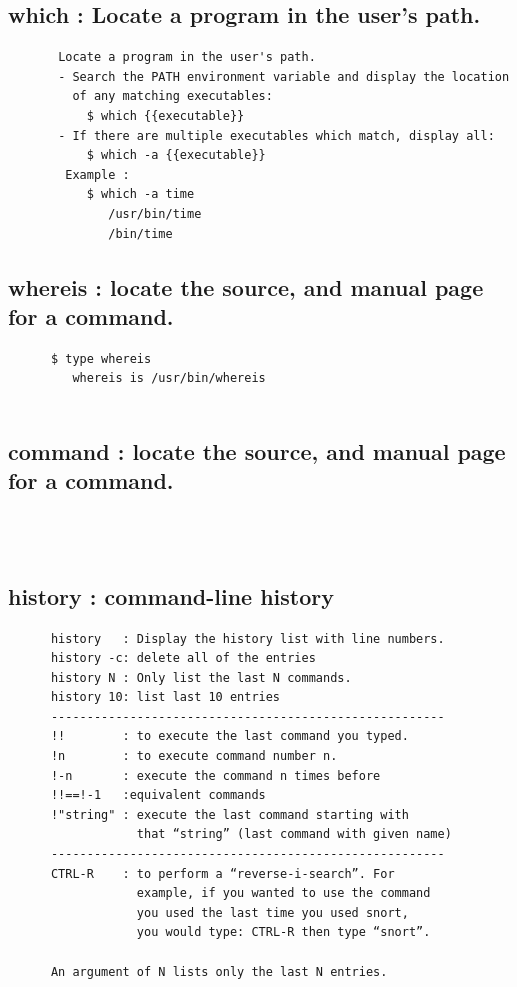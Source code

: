 \documentclass[a4paper,12pt]{article}
\begin{document}
\subsection{which     : Locate a program in the user's path.}
\begin{verbatim}
       Locate a program in the user's path.
       - Search the PATH environment variable and display the location 
         of any matching executables:
           $ which {{executable}}
       - If there are multiple executables which match, display all:
           $ which -a {{executable}}
        Example : 
           $ which -a time
              /usr/bin/time
              /bin/time
\end{verbatim}


\subsection{whereis  : locate the source, and manual page for a command.}
\begin{verbatim}
      $ type whereis
         whereis is /usr/bin/whereis


\end{verbatim}

\subsection{command  : locate the source, and manual page for a command.}
\begin{verbatim}



\end{verbatim}


\subsection{history  : command-line history}
\begin{verbatim}
      history   : Display the history list with line numbers. 
      history -c: delete all of the entries  
      history N : Only list the last N commands.
      history 10: list last 10 entries 
      ------------------------------------------------------- 
      !!        : to execute the last command you typed.
      !n        : to execute command number n.
      !-n       : execute the command n times before
      !!==!-1   :equivalent commands
      !"string" : execute the last command starting with
                  that “string” (last command with given name)
      -------------------------------------------------------            
      CTRL-R    : to perform a “reverse-i-search”. For 
                  example, if you wanted to use the command 
                  you used the last time you used snort,
                  you would type: CTRL-R then type “snort”.
			
      An argument of N lists only the last N entries.
		
\end{verbatim}
\end{document}
